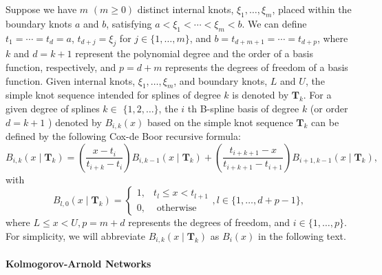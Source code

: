 \documentclass[11pt]{scrartcl}
\begin{document}
Suppose we have $m$ $(m\geq 0)$ distinct internal knots, $\xi_1, \ldots, \xi_m$, placed within the boundary knots $a$ and $b$, satisfying $a<\xi_1<\cdots<\xi_m<b$. We can define $t_1=\cdots=t_d=a$, $t_{d+j}=\xi_j$ for $j \in\{1, \ldots, m\}$, and $b=t_{d+m+1}=\cdots=t_{d+p}$, where $k$ and $d=k+1$ represent the polynomial degree and the order of a basis function, respectively, and $p=d+m$ represents the degrees of freedom of a basis function. Given internal knots, $\xi_1, \ldots, \xi_m$, and boundary knots, $L$ and $U$, the simple knot sequence intended for splines of degree $k$ is denoted by $\mathbf{T}_k$.
For a given degree of splines $k \in$ $\{1,2, \ldots\}$, the $i$ th B-spline basis of degree $k$ (or order $d=k+1$ ) denoted by $B_{i,k}(x)$ based on the simple knot sequence $\mathbf{T}_k$ can be defined by the following Cox-de Boor recursive formula:
\begin{equation*}
	B_{i,k}\left(x \mid \mathbf{T}_k\right)=\left(\frac{x-t_i}{t_{i+k}-t_i}\right) B_{i, k-1}\left(x \mid \mathbf{T}_k\right)+\left(\frac{t_{i+k+1}-x}{t_{i+k+1}-t_{i+1}}\right) B_{i+1, k-1}\left(x \mid \mathbf{T}_k\right),
\end{equation*}
with
\begin{equation*}
	B_{l,0}\left(x \mid \mathbf{T}_k\right)=\left\{\begin{array}{ll}
		1, & t_l \leq x<t_{l+1}  \\
		0, & \text { otherwise }
	\end{array}, l \in\{1, \ldots, d+p-1\}\right.,
\end{equation*}
where $L \leq x<U, p=m+d$ represents the degrees of freedom, and $i \in\{1, \ldots, p\}$.
For simplicity, we will abbreviate $B_{i,k}(x \mid \mathbf{T}_k)$ as $B_{i}(x)$ in the following text.

\paragraph*{Kolmogorov-Arnold Networks}
\end{document}
